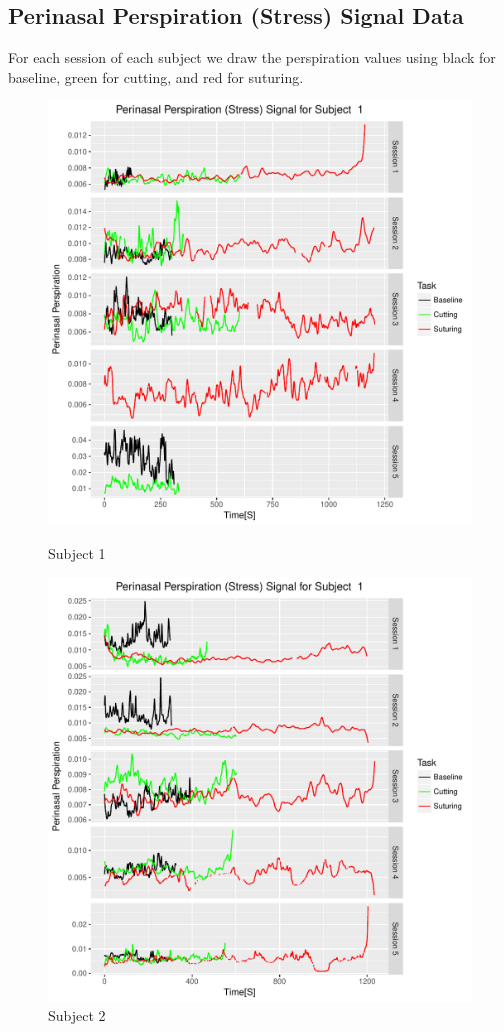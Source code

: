 \documentclass[12pt,epsf]{report}
\begin{document}
\subsection*{Perinasal Perspiration (Stress) Signal Data}
For each session of each subject  we draw the perspiration values using black for baseline, green for cutting, and red for suturing. 
\begin{figure}[!htb]
	\begin{minipage}[c]{0.5\linewidth}
	\includegraphics[width=\linewidth]{s1pp.pdf}
	\caption{Subject 1 }
	\end{minipage}
	\hfill
	\begin{minipage}[c]{0.5\linewidth}
	\includegraphics[width=\linewidth]{s2pp.pdf}
	\caption{Subject 2}
	\end{minipage}
\end{figure}
\FloatBarrier
\end{document}
